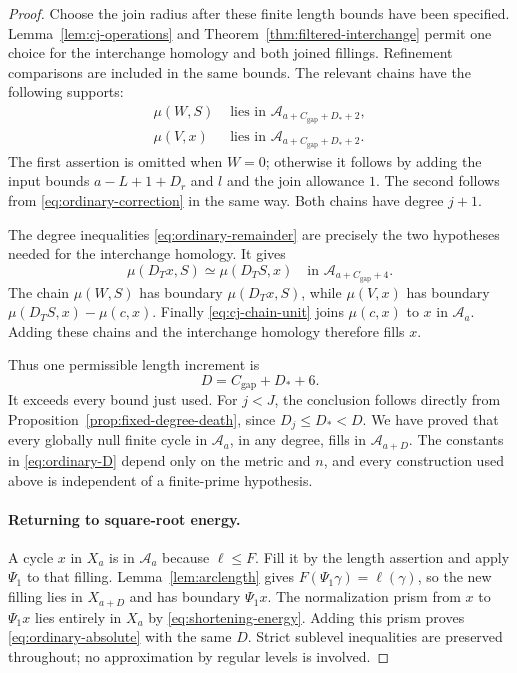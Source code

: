 \begin{proof}
Choose the join radius after these finite length bounds have been
specified.  Lemma~\ref{lem:cj-operations} and
Theorem~\ref{thm:filtered-interchange} permit one choice for the
interchange homology and both joined fillings.  Refinement comparisons
are included in the same bounds.  The relevant chains have the following
supports:
\begin{align}
 \mu(W,S)&\text{ lies in }
   \mathcal A_{a+C_{\mathrm{gap}}+D_*+2},
   \label{eq:ordinary-joined-filling}\\
 \mu(V,x)&\text{ lies in }
   \mathcal A_{a+C_{\mathrm{gap}}+D_*+2}.
   \label{eq:ordinary-joined-correction}
\end{align}
The first assertion is omitted when $W=0$; otherwise it follows by
adding the input bounds $a-L+1+D_r$ and $l$ and the join allowance $1$.
The second follows from \eqref{eq:ordinary-correction} in the same way.
Both chains have degree $j+1$.

The degree inequalities \eqref{eq:ordinary-remainder} are precisely
the two hypotheses needed for the interchange homology.  It gives
\[
 \mu(D_Tx,S)\simeq\mu(D_TS,x)
 \quad\text{in }\mathcal A_{a+C_{\mathrm{gap}}+4}.
\]
The chain $\mu(W,S)$ has boundary $\mu(D_Tx,S)$, while
$\mu(V,x)$ has boundary
$\mu(D_TS,x)-\mu(c,x)$.  Finally
\eqref{eq:cj-chain-unit} joins $\mu(c,x)$ to $x$ in
$\mathcal A_a$.  Adding these chains and the interchange homology
therefore fills $x$.

Thus one permissible length increment is
\begin{equation}\label{eq:ordinary-D}
 D=C_{\mathrm{gap}}+D_*+6.
\end{equation}
It exceeds every bound just used.  For $j<J$, the conclusion follows
directly from Proposition~\ref{prop:fixed-degree-death}, since
$D_j\le D_*<D$.  We have proved that every globally null finite cycle
in $\mathcal A_a$, in any degree, fills in $\mathcal A_{a+D}$.
The constants in \eqref{eq:ordinary-D} depend only on the metric and
$n$, and every construction used above is independent of a finite-prime
hypothesis.

\paragraph{Returning to square-root energy.}
A cycle $x$ in $X_a$ is in $\mathcal A_a$ because $\ell\le F$.
Fill it by the length assertion and apply $\Psi_1$ to that filling.
Lemma~\ref{lem:arclength} gives $F(\Psi_1\gamma)=\ell(\gamma)$, so
the new filling lies in $X_{a+D}$ and has boundary $\Psi_1x$.
The normalization prism from $x$ to $\Psi_1x$ lies entirely in $X_a$
by \eqref{eq:shortening-energy}.  Adding this prism proves
\eqref{eq:ordinary-absolute} with the same $D$.  Strict sublevel
inequalities are preserved throughout; no approximation by regular
levels is involved.


\end{proof}
